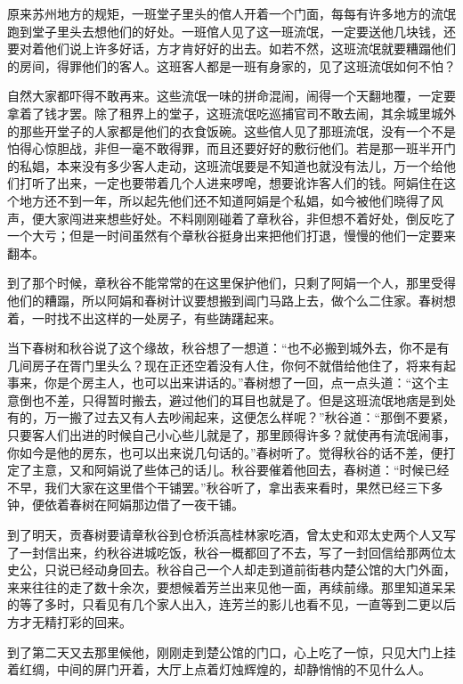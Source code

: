 \documentclass[12pt,UTF8]{ctexbook}
\begin{document}
{{{原来苏州地方的规矩，一班堂子里头的倌人开着一个门面，每每有许多地方的流氓跑到堂子里头去想他们的好处。一班倌人见了这一班流氓，一定要送他几块钱，还要对着他们说上许多好话，方才肯好好的出去。如若不然，这班流氓就要糟蹋他们的房间，得罪他们的客人。这班客人都是一班有身家的，见了这班流氓如何不怕？

自然大家都吓得不敢再来。这些流氓一味的拼命混闹，闹得一个天翻地覆，一定要拿着了钱才罢。除了租界上的堂子，这班流氓吃巡捕官司不敢去闹，其余城里城外的那些开堂子的人家都是他们的衣食饭碗。这些倌人见了那班流氓，没有一个不是怕得心惊胆战，非但一毫不敢得罪，而且还要好好的敷衍他们。若是那一班半开门的私娼，本来没有多少客人走动，这班流氓要是不知道也就没有法儿，万一个给他们打听了出来，一定也要带着几个人进来啰唣，想要讹诈客人们的钱。阿娟住在这个地方还不到一年，所以起先他们还不知道阿娟是个私娼，如今被他们晓得了风声，便大家闯进来想些好处。不料刚刚碰着了章秋谷，非但想不着好处，倒反吃了一个大亏；但是一时间虽然有个章秋谷挺身出来把他们打退，慢慢的他们一定要来翻本。

到了那个时候，章秋谷不能常常的在这里保护他们，只剩了阿娟一个人，那里受得他们的糟蹋，所以阿娟和春树计议要想搬到阊门马路上去，做个么二住家。春树想着，一时找不出这样的一处房子，有些踌躇起来。

当下春树和秋谷说了这个缘故，秋谷想了一想道：“也不必搬到城外去，你不是有几间房子在胥门里头么？现在正还空着没有人住，你何不就借给他住了，将来有起事来，你是个房主人，也可以出来讲话的。”春树想了一回，点一点头道：“这个主意倒也不差，只得暂时搬去，避过他们的耳目也就是了。但是这班流氓地痞是到处有的，万一搬了过去又有人去吵闹起来，这便怎么样呢？”秋谷道：“那倒不要紧，只要客人们出进的时候自己小心些儿就是了，那里顾得许多？就使再有流氓闹事，你如今是他的房东，也可以出来说几句话的。”春树听了。觉得秋谷的话不差，便打定了主意，又和阿娟说了些体己的话儿。秋谷要催着他回去，春树道：“时候已经不早，我们大家在这里借个干铺罢。”秋谷听了，拿出表来看时，果然已经三下多钟，便依着春树在阿娟那边借了一夜干铺。

到了明天，贡春树要请章秋谷到仓桥浜高桂林家吃酒，曾太史和邓太史两个人又写了一封信出来，约秋谷进城吃饭，秋谷一概都回了不去，写了一封回信给那两位太史公，只说已经动身回去。秋谷自己一个人却走到道前街巷内楚公馆的大门外面，来来往往的走了数十余次，要想候着芳兰出来见他一面，再续前缘。那里知道呆呆的等了多时，只看见有几个家人出入，连芳兰的影儿也看不见，一直等到二更以后方才无精打彩的回来。

到了第二天又去那里候他，刚刚走到楚公馆的门口，心上吃了一惊，只见大门上挂着红绸，中间的屏门开着，大厅上点着灯烛辉煌的，却静悄悄的不见什么人。

}}}
\end{document}
